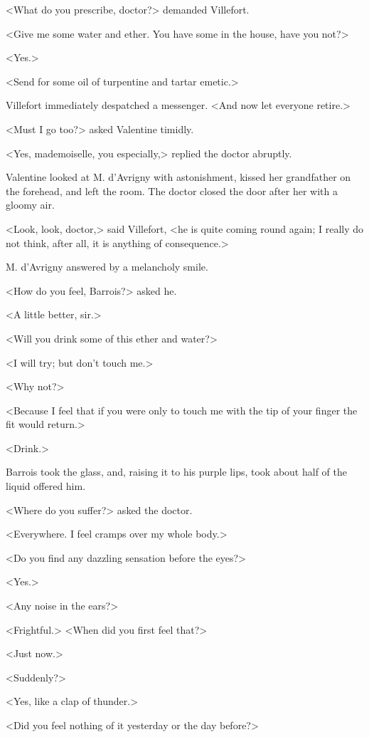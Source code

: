  <What do you prescribe, doctor?> demanded Villefort. 

 <Give me some water and ether. You have some in the house, have you not?> 

 <Yes.> 

 <Send for some oil of turpentine and tartar emetic.> 

 Villefort immediately despatched a messenger. <And now let everyone retire.> 

 <Must I go too?> asked Valentine timidly. 

 <Yes, mademoiselle, you especially,> replied the doctor abruptly. 

 Valentine looked at M. d'Avrigny with astonishment, kissed her grandfather on the forehead, and left the room. The doctor closed the door after her with a gloomy air. 

 <Look, look, doctor,> said Villefort, <he is quite coming round again; I really do not think, after all, it is anything of consequence.> 

 M. d'Avrigny answered by a melancholy smile. 

 <How do you feel, Barrois?> asked he. 

 <A little better, sir.> 

 <Will you drink some of this ether and water?> 

 <I will try; but don't touch me.> 

 <Why not?> 

 <Because I feel that if you were only to touch me with the tip of your finger the fit would return.> 

 <Drink.> 

 Barrois took the glass, and, raising it to his purple lips, took about half of the liquid offered him. 

 <Where do you suffer?> asked the doctor. 

 <Everywhere. I feel cramps over my whole body.> 

 <Do you find any dazzling sensation before the eyes?> 

 <Yes.> 

 <Any noise in the ears?> 

 <Frightful.>  <When did you first feel that?> 

 <Just now.> 

 <Suddenly?> 

 <Yes, like a clap of thunder.> 

 <Did you feel nothing of it yesterday or the day before?> 


